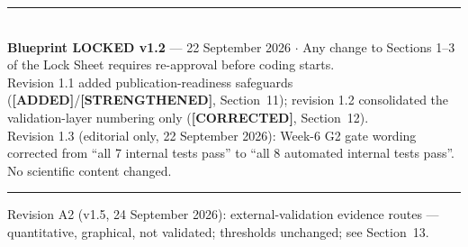 \documentclass[11pt,a4paper]{article}
\newcommand{\ADDED}{{\color{addcol}\textbf{[ADDED]}}}
\newcommand{\STR}{{\color{strcol}\textbf{[STRENGTHENED]}}}
\newcommand{\COR}{{\color{corcol}\textbf{[CORRECTED]}}}
\begin{document}
\vspace{0.4cm}
\begin{center}
{\color{accent}\rule{0.85\textwidth}{0.8pt}}\\[0.3cm]
{\footnotesize \textbf{Blueprint LOCKED v1.2} --- 22 September 2026 \quad$\cdot$\quad
Any change to Sections 1--3 of the Lock Sheet requires re-approval before coding starts.\\[0.1cm]
Revision 1.1 added publication-readiness safeguards (\ADDED/\STR, Section~11); revision 1.2 consolidated the validation-layer numbering only (\COR, Section~12).\\[0.1cm]
Revision 1.3 (editorial only, 22 September 2026): Week-6 G2 gate wording corrected from ``all 7 internal tests pass'' to ``all 8 automated internal tests pass''. No scientific content changed.}\\[0.2cm]
{\color{accent}\rule{0.85\textwidth}{0.8pt}}
\end{center}


Revision A2 (v1.5, 24 September 2026): external-validation evidence routes --- quantitative, graphical, not validated; thresholds unchanged; see Section~13.
\end{document}
